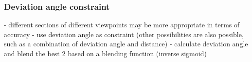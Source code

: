 



\subsubsection{Deviation angle constraint}
- different sections of different viewpoints may be more appropriate in terms of accuracy
- use deviation angle as constraint (other possibilities are also possible, such as a combination of deviation angle and distance)
- calculate deviation angle and blend the best 2 based on a blending function (inverse sigmoid)

